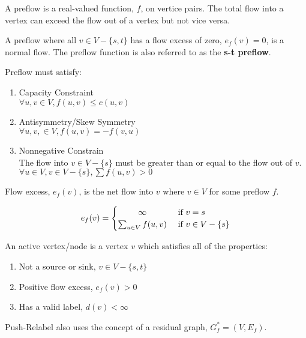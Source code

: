 \begin{definition}[Preflow]
	A preflow is a real-valued function, $f$, on vertice pairs. The total flow into a vertex can exceed the flow out of a vertex but not vice versa.
	
	A preflow where all $v \in V-\{s, t\}$ has a flow excess of zero, $e_f(v) = 0$, is a normal flow. The preflow function is also referred to as the \textbf{s-t preflow}.
	
	Preflow must satisfy:
	\begin{enumerate}
		\item Capacity Constraint\\
		$\forall u,v \in V, f(u,v) \leq c(u,v)$
		
		\item Antisymmetry/Skew Symmetry\\
		$\forall u, v, \in V, f(u,v) = -f(v,u)$
		
		\item Nonnegative Constrain\\
		The flow into $v \in V-\{s\}$ must be greater than or equal to the flow out of $v$. $\forall u \in V, v \in V-\{s\}, \sum f(u,v)>0$
	\end{enumerate}
\end{definition}

\begin{definition}
	Flow excess, $e_f(v)$, is the net flow into $v$ where $v \in V$ for some preflow $f$.
	
	\[
	e_f(v) =
	\begin{cases} 
	\hfill \infty \hfill & \text{ if $v=s$} \\
	\hfill \sum_{u \in V}f(u,v) \hfill & \text{ if $v \in V-\{s\}$} \\
	\end{cases}
	\]
\end{definition}

\begin{definition}
	An active vertex/node is a vertex $v$ which satisfies all of the properties:
	\begin{enumerate}
		\item Not a source or sink, $v \in V-\{s,t\}$
		\item Positive flow excess, $e_f(v) > 0$
		\item Has a valid label, $d(v) < \infty$
	\end{enumerate}
\end{definition}

Push-Relabel also uses the concept of a residual graph, $G^*_f=(V, E_f)$.

